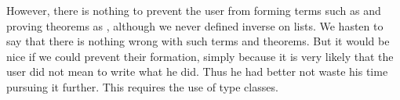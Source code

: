 \begin{isabellebody}
\begin{isamarkuptext}
However, there is nothing to prevent the user from forming terms such as
 and proving theorems as ,
although we never defined inverse on lists. We hasten to say that there is
nothing wrong with such terms and theorems. But it would be nice if we could
prevent their formation, simply because it is very likely that the user did
not mean to write what he did. Thus he had better not waste his time pursuing
it further. This requires the use of type classes.%
\end{isamarkuptext}%
\end{isabellebody}%
